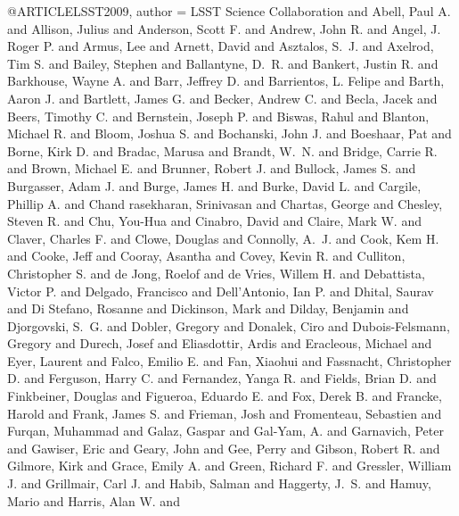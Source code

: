 \documentclass{aa}
\begin{document}
{{{{{{{{{{{{{{@ARTICLE{LSST2009,
       author = {{LSST Science Collaboration} and {Abell}, Paul A. and {Allison}, Julius and
         {Anderson}, Scott F. and {Andrew}, John R. and {Angel}, J. Roger P. and
         {Armus}, Lee and {Arnett}, David and {Asztalos}, S.~J. and
         {Axelrod}, Tim S. and {Bailey}, Stephen and {Ballantyne}, D.~R. and
         {Bankert}, Justin R. and {Barkhouse}, Wayne A. and {Barr}, Jeffrey D. and
         {Barrientos}, L. Felipe and {Barth}, Aaron J. and {Bartlett}, James G. and
         {Becker}, Andrew C. and {Becla}, Jacek and {Beers}, Timothy C. and
         {Bernstein}, Joseph P. and {Biswas}, Rahul and {Blanton}, Michael R. and
         {Bloom}, Joshua S. and {Bochanski}, John J. and {Boeshaar}, Pat and
         {Borne}, Kirk D. and {Bradac}, Marusa and {Brandt}, W.~N. and
         {Bridge}, Carrie R. and {Brown}, Michael E. and {Brunner}, Robert J. and
         {Bullock}, James S. and {Burgasser}, Adam J. and {Burge}, James H. and
         {Burke}, David L. and {Cargile}, Phillip A. and {Chand
        rasekharan}, Srinivasan and {Chartas}, George and {Chesley}, Steven R. and
         {Chu}, You-Hua and {Cinabro}, David and {Claire}, Mark W. and
         {Claver}, Charles F. and {Clowe}, Douglas and {Connolly}, A.~J. and
         {Cook}, Kem H. and {Cooke}, Jeff and {Cooray}, Asantha and
         {Covey}, Kevin R. and {Culliton}, Christopher S. and {de Jong}, Roelof and
         {de Vries}, Willem H. and {Debattista}, Victor P. and
         {Delgado}, Francisco and {Dell'Antonio}, Ian P. and {Dhital}, Saurav and
         {Di Stefano}, Rosanne and {Dickinson}, Mark and {Dilday}, Benjamin and
         {Djorgovski}, S.~G. and {Dobler}, Gregory and {Donalek}, Ciro and
         {Dubois-Felsmann}, Gregory and {Durech}, Josef and
         {Eliasdottir}, Ardis and {Eracleous}, Michael and {Eyer}, Laurent and
         {Falco}, Emilio E. and {Fan}, Xiaohui and {Fassnacht}, Christopher D. and
         {Ferguson}, Harry C. and {Fernandez}, Yanga R. and {Fields}, Brian D. and
         {Finkbeiner}, Douglas and {Figueroa}, Eduardo E. and {Fox}, Derek B. and
         {Francke}, Harold and {Frank}, James S. and {Frieman}, Josh and
         {Fromenteau}, Sebastien and {Furqan}, Muhammad and {Galaz}, Gaspar and
         {Gal-Yam}, A. and {Garnavich}, Peter and {Gawiser}, Eric and
         {Geary}, John and {Gee}, Perry and {Gibson}, Robert R. and
         {Gilmore}, Kirk and {Grace}, Emily A. and {Green}, Richard F. and
         {Gressler}, William J. and {Grillmair}, Carl J. and {Habib}, Salman and
         {Haggerty}, J.~S. and {Hamuy}, Mario and {Harris}, Alan W. and
}}}}}}}}}}}}}}}}
\end{document}
